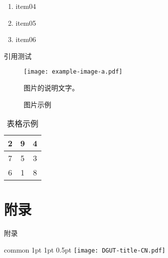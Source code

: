 \documentclass[
    report,     %
    oneside,    %
    UTF8,       %
    zihao=-4    %
]{config}
\begin{document}
\begin{enumerate}
    \item item04
    \item item05
    \item item06
\end{enumerate}

引用测试\cite{zhangkun1994}

\begin{figure}[H] %
    \centering %
    \texttt{[image: example-image-a.pdf]} %
    \caption*{图片的说明文字。} %
    \caption{图片示例} %
    \label{fig:example1} %
\end{figure}

\begin{table}[H] %
    \centering %
    \caption{表格示例} %
    \label{tab:example} %
    \renewcommand\arraystretch{1.5} %
    \setlength{\tabcolsep}{30pt} %
    \begin{tabular}{|c|c|c|}  %
        \hline %
        2 & 9 & 4 \\ %
        \hline %
        7 & 5 & 3 \\ %
        \hline %
        6 & 1 & 8 \\ %
        \hline %
    \end{tabular}
\end{table}


\begin{references}
\end{references}


\StartAppendix %

\chapter{附录}

附录


\Header
    {common} %
    {1pt} %
    {1pt} %
    {0.5pt} %
    {} %
    {\texttt{[image: DGUT-title-CN.pdf]}} %
    {} %
\end{document}
